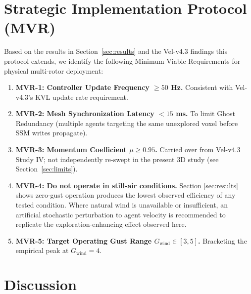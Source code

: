 \documentclass[10pt,journal]{IEEEtran}
\begin{document}
\section{Strategic Implementation Protocol (MVR)}
\label{sec:mvr}

Based on the results in Section~\ref{sec:results} and the Vel-v4.3
findings this protocol extends, we identify the following Minimum Viable
Requirements for physical multi-rotor deployment:

\begin{enumerate}
\item \textbf{MVR-1: Controller Update Frequency $\geq 50$ Hz.} Consistent
with Vel-v4.3's KVL update rate requirement.
\item \textbf{MVR-2: Mesh Synchronization Latency $< 15$ ms.} To limit
Ghost Redundancy (multiple agents targeting the same unexplored voxel
before SSM writes propagate).
\item \textbf{MVR-3: Momentum Coefficient $\mu \geq 0.95$.} Carried over
from Vel-v4.3 Study IV; not independently re-swept in the present 3D study
(see Section~\ref{sec:limits}).
\item \textbf{MVR-4: Do not operate in still-air conditions.} Section
\ref{sec:results} shows zero-gust operation produces the lowest observed
efficiency of any tested condition. Where natural wind is unavailable or
insufficient, an artificial stochastic perturbation to agent velocity is
recommended to replicate the exploration-enhancing effect observed here.
\item \textbf{MVR-5: Target Operating Gust Range $G_{\text{wind}} \in
[3,5]$.} Bracketing the empirical peak at $G_{\text{wind}}=4$.
\end{enumerate}

\section{Discussion}
\label{sec:discussion}
\end{document}

